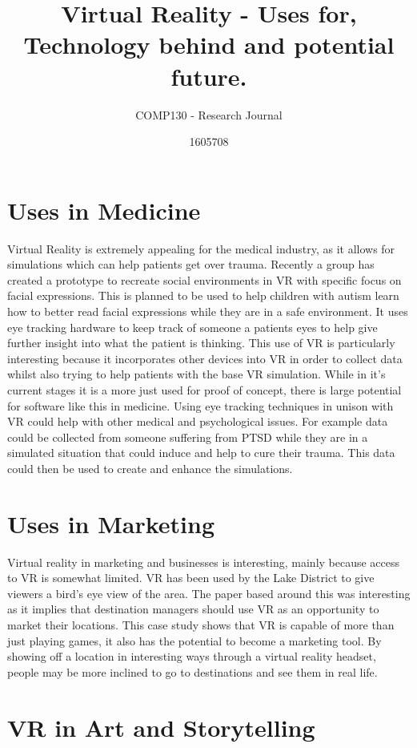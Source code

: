 \documentclass{scrartcl}
\title{Virtual Reality - Uses for, Technology behind and potential future.}
\subtitle{COMP130 - Research Journal}
\author{1605708}
\begin{document}
\maketitle

\section{Uses in Medicine}

Virtual Reality is extremely appealing for the medical industry, as it allows for simulations which can help patients get over trauma. Recently a group has created a prototype to recreate social environments in VR with specific focus on facial expressions. This is planned to be used to help children with autism learn how to better read facial expressions while they are in a safe environment\cite{lahiri2011design}. It uses eye tracking hardware to keep track of someone a patients eyes to help give further insight into what the patient is thinking.  
This use of VR is particularly interesting because it incorporates other devices into VR in order to collect data whilst also trying to help patients with the base VR simulation. While in it's current stages it is a more just used for proof of concept, there is large potential for software like this in medicine. Using eye tracking techniques in unison with VR could help with other medical and psychological issues. For example data could be collected from someone suffering from PTSD while they are in a simulated situation that could induce and help to cure their trauma. This data could then be used to create and enhance the simulations. 

\section{Uses in Marketing}

Virtual reality in marketing and businesses is interesting, mainly because access to VR is somewhat limited. VR has been used by the Lake District to give viewers a bird's eye view of the area. The paper based around this was interesting as it implies that destination managers should use VR as an opportunity to market their locations. 
This case study shows that VR is capable of more than just playing games\cite{VRtourists}, it also has the potential to become a marketing tool. By showing off a location in interesting ways through a virtual reality headset, people may be more inclined to go to destinations and see them in real life.

\section{VR in Art and Storytelling}
\end{document}
